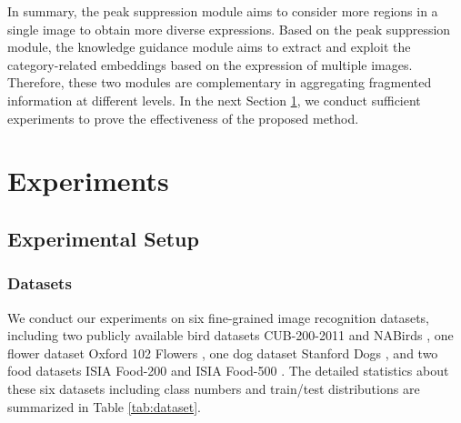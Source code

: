 \documentclass[5p,twocolumn]{elsarticle}
\begin{document}
In summary, the peak suppression module aims to consider more regions in a single image to obtain more diverse expressions. Based on the peak suppression module, the knowledge guidance module aims to extract and exploit the category-related embeddings based on the expression of multiple images. Therefore, these two modules are complementary in aggregating fragmented information at different levels. 
In the next Section \ref{sec.exp}, we conduct sufficient experiments to prove the effectiveness of the proposed method. 

\section{Experiments}\label{sec.exp}
\subsection{Experimental Setup}
\subsubsection{\textbf{Datasets}}
We conduct our experiments on six fine-grained image recognition datasets,
including two publicly available bird datasets CUB-200-2011 \cite{Wah2011Caltech} and NABirds \cite{Horn2015Building}, one flower dataset Oxford 102 Flowers \cite{Nilsback2008Automated}, one dog dataset Stanford Dogs \cite{Khosla2011Novel}, and two food datasets ISIA Food-200 \cite{Min2019Ingredient} and ISIA Food-500 \cite{Min-ISIA-500-MM2020}. The detailed statistics about these six datasets including class numbers and train/test distributions are summarized in Table \ref{tab:dataset}.

\begin{table}[h]
\centering
  \caption{Fine-grained image dataset statistics.}
  \label{tab:dataset}
\end{table}
\end{document}
